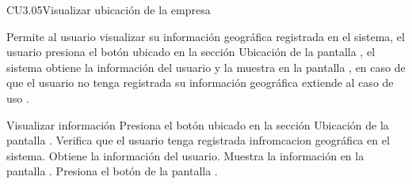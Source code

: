 
\begin{UseCase}{CU3.05}{Visualizar ubicación de la empresa}{
    Permite al usuario  visualizar su información geográfica registrada en el sistema, el usuario presiona el botón   ubicado en la sección Ubicación de la pantalla , el sistema obtiene la información del usuario y la muestra en la pantalla , en caso de que el usuario no tenga registrada su información geográfica extiende al caso de uso .
       
    \bigskip
}
		
\end{UseCase}
	
	\begin{UCtrayectoria}{Visualizar información }
		\UCpaso[\UCactor]Presiona el botón  ubicado en la sección  Ubicación de la pantalla . 
		\UCpaso[\UCsist] Verifica que el usuario tenga registrada infromcacion geográfica en el sistema.
		\UCpaso[\UCsist] Obtiene la información del usuario.
		\UCpaso[\UCsist] Muestra la información en la pantalla . 
        \UCpaso[\UCactor]Presiona el botón  de la pantalla .
		
	\end{UCtrayectoria}
	


